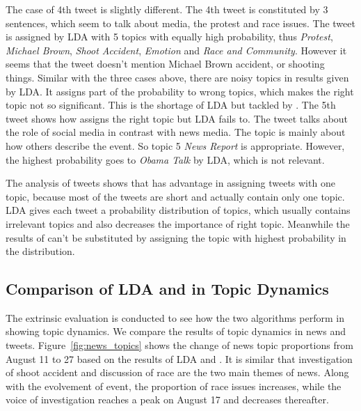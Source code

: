 The case of 4th tweet is slightly different. The 4th tweet is constituted by 3 sentences, which seem to talk about media, the protest and race issues. The tweet is assigned by LDA with 5 topics with equally high probability, thus \emph{Protest}, \emph{Michael Brown}, \emph{Shoot Accident}, \emph{Emotion} and \emph{Race and Community}. However it seems that the tweet doesn't mention Michael Brown accident, or shooting things. Similar with the three cases above, there are noisy topics in results given by LDA. It assigns part of the probability to wrong topics, which makes the right topic not so significant. This is the shortage of LDA but tackled by \stlda.
The 5th tweet shows how \stlda assigns the right topic but LDA fails to. The tweet talks about the role of social media in contrast with news media. The topic is mainly about how others describe the event. So topic 5 \emph{News Report} is appropriate. However, the highest probability goes to \emph{Obama Talk} by LDA, which is not relevant.

The analysis of tweets shows that \stlda has advantage in assigning tweets with one topic, because most of the tweets are short and actually contain only one topic. LDA gives each tweet a probability distribution of topics, which usually contains irrelevant topics and also decreases the importance of right topic. Meanwhile the results of \stlda can't be substituted by assigning the topic with highest probability in the distribution.

\subsection{Comparison of LDA and \stlda in Topic Dynamics}
\label{subsec:extrinsic}

The extrinsic evaluation is conducted to see how the two algorithms perform in showing topic dynamics. We compare the results of topic dynamics in news and tweets. Figure~\ref{fig:news_topics} shows the change of news topic proportions from August 11 to 27 based on the results of LDA and \stlda. It is similar that investigation of shoot accident and discussion of race are the two main themes of news. Along with the evolvement of event, the proportion of race issues increases, while the voice of investigation reaches a peak on August 17 and decreases thereafter.

